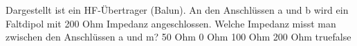     {Dargestellt ist ein HF-Übertrager (Balun). An den Anschlüssen a und b wird ein Faltdipol mit 200 Ohm Impedanz angeschlossen. Welche Impedanz misst man zwischen den Anschlüssen a und m?}
    {50 Ohm}
    {0 Ohm}
    {100 Ohm}
    {200 Ohm}
    {true}{false}